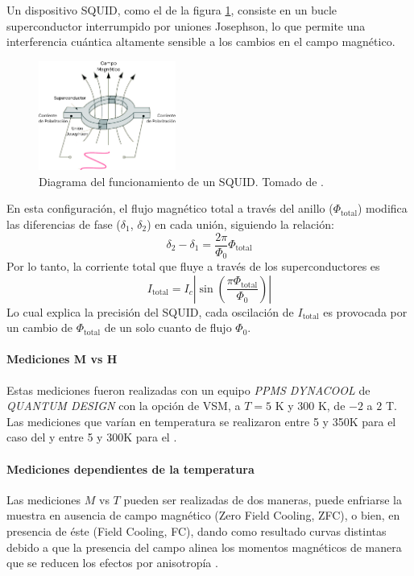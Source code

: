 \documentclass[../main.tex]{subfiles}
\begin{document}
Un dispositivo SQUID, como el de la figura \ref{fig:squiddiag}, consiste en un bucle superconductor interrumpido por uniones Josephson, lo que permite una interferencia cuántica altamente sensible a los cambios en el campo magnético.

\begin{figure}[H]
    \centering
    \includegraphics[width=0.4\textwidth]{fig/squiddiag.png}
    \caption{Diagrama del funcionamiento de un SQUID. Tomado de \cite{Marcon2012}.}
    \label{fig:squiddiag}
\end{figure}
En esta configuración, el flujo magnético total a través del anillo ($\Phi_\text{total}$) modifica las diferencias de fase ($\delta_1$, $\delta_2$) en cada unión, siguiendo la relación:
\begin{equation}
    \delta_2-\delta_1=\dfrac{2\pi}{\Phi_0}\Phi_\text{total}
    \label{eq:flujoSQUID}
\end{equation}
Por lo tanto, la corriente total que fluye a través de los superconductores es
\begin{equation}
    I_\text{total}=I_c\left|\sin\left(\dfrac{\pi\Phi_\text{total}}{\Phi_0}\right)\right|
    \label{eq:corrienteSQUID}
\end{equation}
Lo cual explica la precisión del SQUID, cada oscilación de $I_\text{total}$ es provocada por un cambio de $\Phi_\text{total}$ de un solo cuanto de flujo $\Phi_0$.
\paragraph{Mediciones M vs H}
Estas mediciones fueron realizadas con un equipo \textit{PPMS DYNACOOL} de \textit{QUANTUM DESIGN} con la opción de VSM, a $T=5$ K y $300$ K, de $-2$ a $2$ T.
Las mediciones que varían en temperatura se realizaron entre 5 y 350K para el caso del \sama{} y entre 5 y 300K para el \neod{}.
\paragraph{Mediciones dependientes de la temperatura}
Las mediciones $M$ vs $T$ pueden ser realizadas de dos maneras, puede enfriarse la muestra en ausencia de campo magnético (Zero Field Cooling, ZFC), o bien, en presencia de éste (Field Cooling, FC), dando como resultado curvas distintas debido a que la presencia del campo alinea los momentos magnéticos de manera que se reducen los efectos por anisotropía \cite{Ali2014}.
\end{document}
